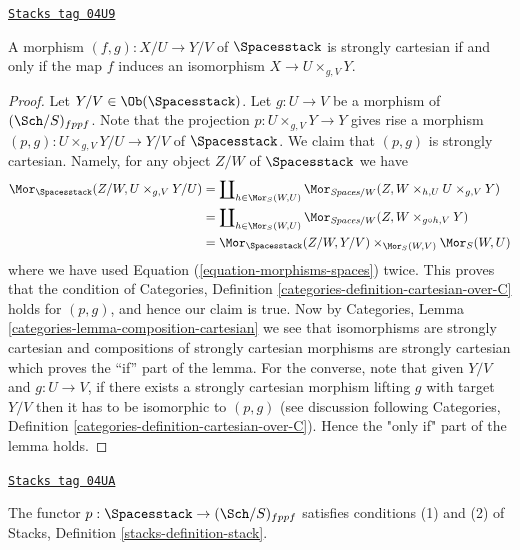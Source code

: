 \begin{lemma}
\label{examples-stacks-lemma-spaces-strongly-cartesian}
\href{https://stacks.math.columbia.edu/tag/04U9}{\texttt{Stacks tag 04U9}}

A morphism $(f, g) : X/U \to Y/V$
of $\Spacesstack$ is strongly cartesian if and only if the
map $f$ induces an isomorphism $X \to U \times_{g, V} Y$.
\end{lemma}

\begin{proof}
Let $Y/V \in \Ob(\Spacesstack)$.
Let $g : U \to V$ be a morphism of $(\Sch/S)_{fppf}$.
Note that the projection $p : U \times_{g, V} Y \to Y$
gives rise a morphism
$(p, g) : U \times_{g, V} Y/U \to Y/V$ of $\Spacesstack$.
We claim that $(p, g)$ is strongly cartesian.
Namely, for any object $Z/W$ of $\Spacesstack$ we have
\begin{align*}
\Mor_{\Spacesstack}(Z/W, U \times_{g, V} Y/U)
& =
\coprod\nolimits_{h \in \Mor_S(W, U)}
\Mor_{\textit{Spaces}/W}(Z, W \times_{h, U} U \times_{g, V} Y) \\
& =
\coprod\nolimits_{h \in \Mor_S(W, U)}
\Mor_{\textit{Spaces}/W}(Z, W \times_{g \circ h, V} Y) \\
& =
\Mor_{\Spacesstack}(Z/W, Y/V)
\times_{\Mor_S(W, V)} \Mor_S(W, U)
\end{align*}
where we have used Equation (\ref{equation-morphisms-spaces}) twice.
This proves that the condition of
Categories, Definition \ref{categories-definition-cartesian-over-C}
holds for $(p, g)$, and hence our claim is true. Now by
Categories, Lemma \ref{categories-lemma-composition-cartesian}
we see that isomorphisms are strongly cartesian and
compositions of strongly cartesian morphisms are strongly cartesian
which proves the ``if'' part of the lemma. For the converse, note
that given $Y/V$ and $g : U \to V$, if there exists a
strongly cartesian morphism lifting $g$ with target $Y/V$
then it has to be isomorphic to $(p, g)$ (see discussion following
Categories, Definition \ref{categories-definition-cartesian-over-C}).
Hence the "only if" part of the lemma holds.
\end{proof}

\begin{lemma}
\label{examples-stacks-lemma-pre-stack-of-spaces}
\href{https://stacks.math.columbia.edu/tag/04UA}{\texttt{Stacks tag 04UA}}

The functor $p : \Spacesstack \to (\Sch/S)_{fppf}$
satisfies conditions (1) and (2) of
Stacks, Definition \ref{stacks-definition-stack}.
\end{lemma}

